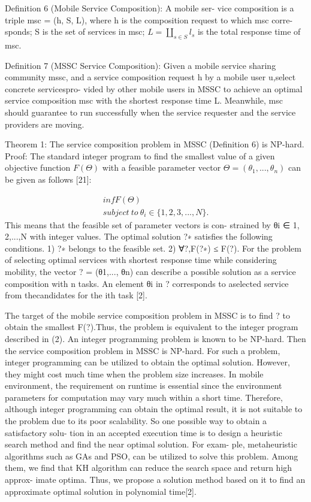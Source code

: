 \documentclass[10pt,journal,compsoc]{IEEEtran}
\begin{document}
Definition 6 (Mobile Service Composition): A mobile ser-
vice composition is a triple msc = (h, S, L), where h
is the composition request to which msc corre- sponds;
S is the set of services in msc;
$L = \coprod_{s \in S} l_s$ is the total response time of msc.

Definition 7 (MSSC Service Composition): Given a mobile service sharing community mssc, and a service composition request h by a mobile user u,select concrete servicespro- vided by other mobile users in MSSC to achieve an optimal service composition msc with the shortest response time L. Meanwhile, msc should guarantee to run successfully when the service requester and the service providers are moving.

Theorem 1: The service composition problem in MSSC (Definition 6) is NP-hard.
Proof: The standard integer program to find the smallest value of a given objective function $F(\Theta)$ with a feasible parameter vector $\Theta = (\theta_1,..., \theta_n)$ can be given as follows [21]:

\begin{eqnarray}
inf F(\Theta)\\\nonumber
subject \ to \  \theta_i \in \{1,2,3,...,N\}.
\end{eqnarray}
This means that the feasible set of parameter vectors is con-
strained by θi ∈ {1, 2,...,N} with integer values. The optimal solution ?∗ satisfies the following conditions.
1) ?∗ belongs to the feasible set.
2) ∀?,F(?∗) ≤ F(?). For the problem of selecting optimal services with shortest response time while considering mobility, the vector ? = (θ1,..., θn) can describe a possible solution as a service composition with n tasks. An element θi in ? corresponds to aselected service from thecandidates for the ith task [2].

The target of the mobile service composition problem in
MSSC is to find ? to obtain the smallest F(?).Thus, the problem is equivalent to the integer program described in (2). An integer programming problem is known to be NP-hard. Then the service composition problem in MSSC is NP-hard. For such a problem, integer programming can be utilized to
obtain the optimal solution. However, they might cost much time when the problem size increases. In mobile environment, the requirement on runtime is essential since the environment parameters for computation may vary much within a short time. Therefore, although integer programming can obtain the optimal result, it is not suitable to the problem due to its poor scalability. So one possible way to obtain a satisfactory solu- tion in an accepted execution time is to design a heuristic search method and find the near optimal solution. For exam- ple, metaheuristic algorithms such as GAs and PSO, can be utilized to solve this problem. Among them, we find that KH algorithm can reduce the search space and return high approx- imate optima. Thus, we propose a solution method based on it to find an approximate optimal solution in polynomial time[2].
\end{document}

